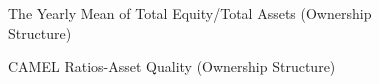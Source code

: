 \documentclass[
  12pt,
  a4paper,
]{scrreprt}
\begin{document}
{{{{\begin{figure}
\caption{\label{fig-CAMELTE}The Yearly Mean of Total Equity/Total Assets
(Ownership Structure)}

\end{figure}%

\begin{figure}


\caption{\label{fig-CAMELAQ}CAMEL Ratios-Asset Quality (Ownership
Structure)}

\end{figure}%

\begin{figure}

\end{figure}}}}}
\end{document}
